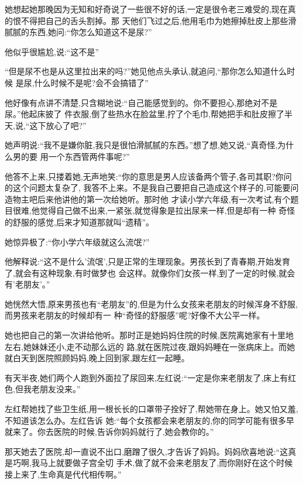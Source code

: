 ﻿\documentclass[12pt]{article}
\begin{document}
她想起她那晚因为无知和好奇说了一些很不好的话,一定是很令老三难受的,现在真的恨不得把自己的舌头割掉。那
天他们飞过之后,他用毛巾为她擦掉肚皮上那些滑腻腻的东西,她问:``你怎么知道这\myrule 不是\myrule 尿?''

他似乎很尴尬,说:``这不是\myrule ''

``但是尿不也是\myrule 从这里拉出来的吗?''她见他点头承认,就追问,``那你\myrule 怎么知道什么时候\myrule 
是尿,什么时候不是呢?会不会搞错了\myrule ''

他好像有点讲不清楚,只含糊地说:``自己能感觉到的。你不要担心,那\myrule 绝对不是\myrule 尿。''他起床披了
件衣服,倒了些热水在脸盆里,拧了个毛巾,帮她把手和肚皮擦了半天,说,``这下放心了吧?''

她声明说:``我不是\myrule 嫌你脏,我只是很怕滑腻腻的东西。''想了想,她又说,``真奇怪,为什么男的\myrule 要
用一个\myrule 东西管两件事呢?''

他答不上来,只搂着她,无声地笑:``你的意思是男人应该备两个管子,各司其职?你问的这个问题太\myrule 复杂了,
我答不上来。不是我自己要把自己造成这个样子的,可能要问造物主吧\myrule 后来他讲他的第一次给她听。那时他
才读小学六年级,有一次考试,有个题目很难,他觉得自己做不出来,一紧张,就觉得象是拉出尿来一样,但是却有一种
奇怪的舒服的感觉,后来才知道那就叫``遗精''。

她惊异极了:``你小学六年级就\myrule 这么\myrule 流氓?''

他解释说:``这不是什么'流氓',只是正常的生理现象。男孩长到了青春期,开始发育了,就会有这种现象,有时做梦也
会这样。就像你们女孩一样,到了一定的时候,就会有\myrule '老朋友'。''

她恍然大悟,原来男孩也有``老朋友''的,但是为什么女孩来老朋友的时候浑身不舒服,而男孩来老朋友的时候却有一
种``奇怪的舒服感''呢?好像不大公平一样。

她也把自己的第一次讲给他听。那时正是她妈妈住院的时候,医院离她家有十里地左右,她妹妹还小,走不动那么远的
路,就在医院过夜,跟妈妈睡在一张病床上。而她就白天到医院照顾妈妈,晚上回到家,跟左红一起睡。

有天半夜,她们两个人跑到外面拉了尿回来,左红说:``一定是你来老朋友了,床上有红色,但我老朋友没来。''

左红帮她找了些卫生纸,用一根长长的口罩带子拴好了,帮她带在身上。她又怕又羞,不知道该怎么办。左红告诉
她:``每个女孩都会来老朋友的,你的同学可能有很多早就来了。你去医院的时候,告诉你妈妈就行了,她会教你的。''

那天她去了医院,却一直说不出口,磨蹭了很久,才告诉了妈妈。妈妈欣喜地说:``这真是巧啊,我马上就要做子宫全切
手术,做了就不会来老朋友了,而你刚好在这个时候接上来了,生命真是代代相传啊。''
\end{document}
